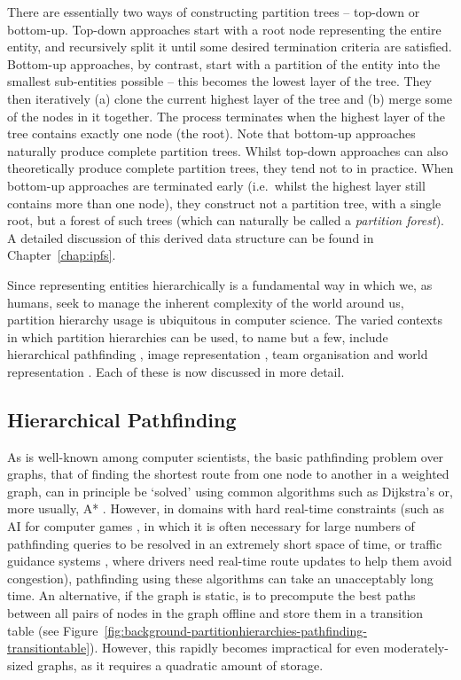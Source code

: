 There are essentially two ways of constructing partition trees -- top-down or bottom-up. Top-down approaches start with a root node representing the entire entity, and recursively split it until some desired termination criteria are satisfied. Bottom-up approaches, by contrast, start with a partition of the entity into the smallest sub-entities possible -- this becomes the lowest layer of the tree. They then iteratively (a) clone the current highest layer of the tree and (b) merge some of the nodes in it together. The process terminates when the highest layer of the tree contains exactly one node (the root). Note that bottom-up approaches naturally produce complete partition trees. Whilst top-down approaches can also theoretically produce complete partition trees, they tend not to in practice. When bottom-up approaches are terminated early (i.e.~whilst the highest layer still contains more than one node), they construct not a partition tree, with a single root, but a forest of such trees (which can naturally be called a \emph{partition forest}). A detailed discussion of this derived data structure can be found in Chapter~\ref{chap:ipfs}.

Since representing entities hierarchically is a fundamental way in which we, as humans, seek to manage the inherent complexity of the world around us, partition hierarchy usage is ubiquitous in computer science. The varied contexts in which partition hierarchies can be used, to name but a few, include hierarchical pathfinding \cite{dickheiser04,jing96,jung96,kim98,vandersterren04}, image representation \cite{al-haj08,andrade03,salembier00}, team organisation \cite{?} and world representation \cite{finkel74,fuchs80}. Each of these is now discussed in more detail.

\subsection{Hierarchical Pathfinding}

As is well-known among computer scientists, the basic pathfinding problem over graphs, that of finding the shortest route from one node to another in a weighted graph, can in principle be `solved' using common algorithms such as Dijkstra's or, more usually, A* \cite{aima}. However, in domains with hard real-time constraints (such as AI for computer games \cite{dickheiser04,vandersterren04}, in which it is often necessary for large numbers of pathfinding queries to be resolved in an extremely short space of time, or traffic guidance systems \cite{jing96,jung96,kim98}, where drivers need real-time route updates to help them avoid congestion), pathfinding using these algorithms can take an unacceptably long time. An alternative, if the graph is static, is to precompute the best paths between all pairs of nodes in the graph offline and store them in a transition table (see Figure~\ref{fig:background-partitionhierarchies-pathfinding-transitiontable}). However, this rapidly becomes impractical for even moderately-sized graphs, as it requires a quadratic amount of storage.

